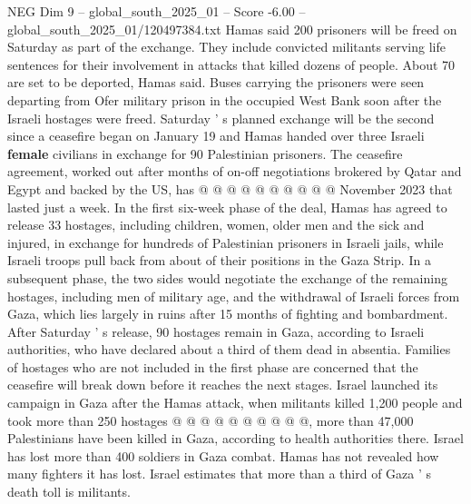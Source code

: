 \begin{textsample}{NEG Dim 9 – global\_south\_2025\_01 – Score -6.00 – global\_south\_2025\_01/120497384.txt}
Hamas said 200 prisoners will be freed on Saturday as part of the exchange.
They include convicted militants serving life sentences for their involvement in attacks that killed dozens of people.
About 70 are set to be deported, Hamas said.
Buses carrying the prisoners were seen departing from Ofer military prison in the occupied West Bank soon after the Israeli hostages were freed.
Saturday ' s planned exchange will be the second since a ceasefire began on January 19 and Hamas handed over three Israeli \textbf{female} civilians in exchange for 90 Palestinian prisoners.
The ceasefire agreement, worked out after months of on-off negotiations brokered by Qatar and Egypt and backed by the US, has @ @ @ @ @ @ @ @ @ @ November 2023 that lasted just a week.
In the first six-week phase of the deal, Hamas has agreed to release 33 hostages, including children, women, older men and the sick and injured, in exchange for hundreds of Palestinian prisoners in Israeli jails, while Israeli troops pull back from about of their positions in the Gaza Strip.
In a subsequent phase, the two sides would negotiate the exchange of the remaining hostages, including men of military age, and the withdrawal of Israeli forces from Gaza, which lies largely in ruins after 15 months of fighting and bombardment.
After Saturday ' s release, 90 hostages remain in Gaza, according to Israeli authorities, who have declared about a third of them dead in absentia.
Families of hostages who are not included in the first phase are concerned that the ceasefire will break down before it reaches the next stages.
Israel launched its campaign in Gaza after the Hamas attack, when militants killed 1,200 people and took more than 250 hostages @ @ @ @ @ @ @ @ @ @, more than 47,000 Palestinians have been killed in Gaza, according to health authorities there.
Israel has lost more than 400 soldiers in Gaza combat.
Hamas has not revealed how many fighters it has lost.
Israel estimates that more than a third of Gaza ' s death toll is militants.

\end{textsample}
